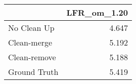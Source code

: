 \begin{tabular}{lr}
\toprule
{} & LFR_om_1.20 \\
\midrule
No Clean Up  &       4.647 \\
Clean-merge  &       5.192 \\
Clean-remove &       5.188 \\
Ground Truth &       5.419 \\
\bottomrule
\end{tabular}
